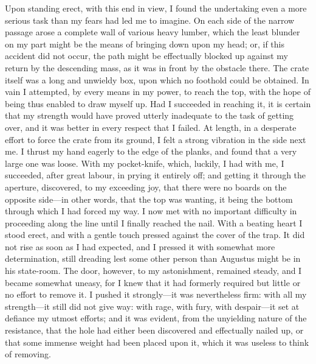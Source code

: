 Upon standing erect, with this end in view, I found the undertaking even a
more serious task than my fears had led me to imagine. On each side of the
narrow passage arose a complete wall of various heavy lumber, which the least
blunder on my part might be the means of bringing down upon my head; or, if this
accident did not occur, the path might be effectually blocked up against my
return by the descending mass, as it was in front by the obstacle there. The
crate itself was a long and unwieldy box, upon which no foothold could be
obtained. In vain I attempted, by every means in my power, to reach the top,
with the hope of being thus enabled to draw myself up. Had I succeeded in
reaching it, it is certain that my strength would have proved utterly inadequate
to the task of getting over, and it was better in every respect that I failed.
At length, in a desperate effort to force the crate from its ground, I felt a
strong vibration in the side next me. I thrust my hand eagerly to the edge of
the planks, and found that a very large one was loose. With my pocket-knife,
which, luckily, I had with me, I succeeded, after great labour, in prying it
entirely off; and getting it through the aperture, discovered, to my exceeding
joy, that there were no boards on the opposite side---in other words, that the
top was wanting, it being the bottom through which I had forced my way. I now
met with no important difficulty in proceeding along the line until I finally
reached the nail. With a beating heart I stood erect, and with a gentle touch
pressed against the cover of the trap. It did not rise as soon as I had
expected, and I pressed it with somewhat more determination, still dreading lest
some other person than Augustus might be in his state-room. The door, however,
to my astonishment, remained steady, and I became somewhat uneasy, for I knew
that it had formerly required but little or no effort to remove it. I pushed it
strongly---it was nevertheless firm: with all my strength---it still did not
give way: with rage, with fury, with despair---it set at defiance my utmost
efforts; and it was evident, from the unyielding nature of the resistance, that
the hole had either been discovered and effectually nailed up, or that some
immense weight had been placed upon it, which it was useless to think of
removing. 

